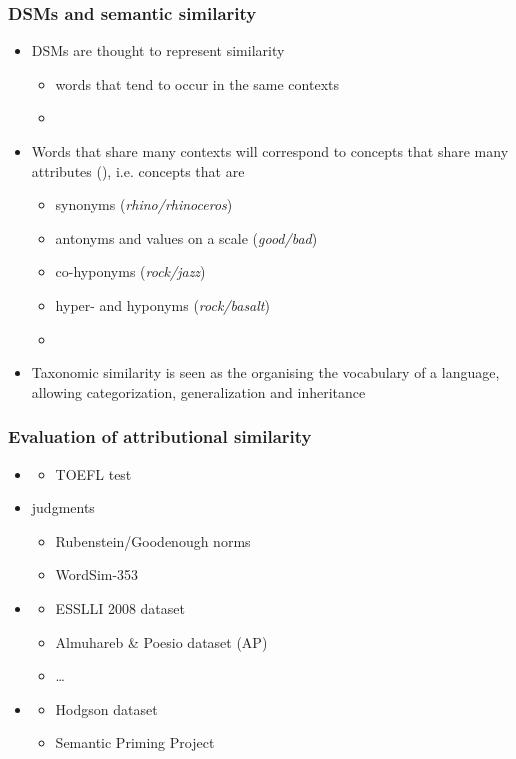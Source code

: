 \documentclass[t]{beamer} %
\begin{document}
\begin{frame}
  \frametitle{DSMs and semantic similarity}
  \begin{itemize}
   \item DSMs are thought to represent  similarity
   \begin{itemize}
    \item words that tend to occur in the same contexts
    \item[]
    \end{itemize}
  \item Words that share many contexts will correspond to concepts
    that share many attributes (),
    i.e. concepts that are 
    \begin{itemize}
    \item synonyms (\emph{rhino/rhinoceros})
    \item antonyms and values on a scale (\emph{good/bad})
    \item co-hyponyms (\emph{rock/jazz})
    \item hyper- and hyponyms (\emph{rock/basalt})
    \item[]
    \end{itemize}
  \item Taxonomic similarity is seen as the  organising the vocabulary of a language, allowing categorization, generalization and inheritance
  \end{itemize}
\end{frame}

\begin{frame}
  \frametitle{Evaluation of attributional similarity}
  
  \begin{itemize}
  \item {}
    \begin{itemize}
    \item TOEFL test
    \end{itemize}
  \item {} judgments
    \begin{itemize}
    \item Rubenstein/Goodenough norms
    \item WordSim-353
    \end{itemize}
  \item {}
    \begin{itemize}
    \item ESSLLI 2008 dataset
    \item Almuhareb \& Poesio dataset (AP)
    \item \ldots
    \end{itemize}
  \item {}
    \begin{itemize}
    \item Hodgson dataset
    \item Semantic Priming Project 
    \end{itemize}
  \end{itemize}
\end{frame}
\end{document}
